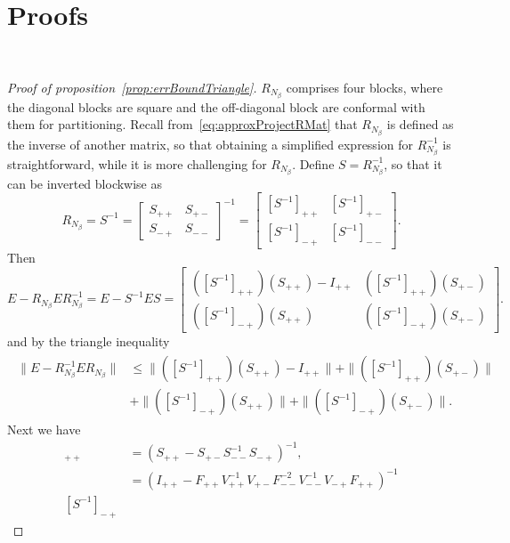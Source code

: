 \section{Proofs}~\label{app:Proofs}

\begin{proof}[Proof of proposition~\ref{prop:errBoundTriangle}]
    $R_{N_\beta}$ comprises four blocks, where the diagonal blocks are square and the off-diagonal block are conformal with them for partitioning. Recall from~\eqref{eq:approxProjectRMat} that $R_{N_\beta}$ is defined as the inverse of another matrix, so that obtaining a simplified expression for $R_{N_\beta}^{-1}$ is straightforward, while it is more challenging for $R_{N_\beta}$. Define $S=R_{N_\beta}^{-1}$, so that it can be inverted blockwise as
    \[
        R_{N_\beta}=S^{-1}=
        \begin{bmatrix}
            S_{++} & S_{+-}\\
            S_{-+} & S_{--}
        \end{bmatrix}^{-1}
        =
        \begin{bmatrix}
            [S^{-1}]_{++} & [S^{-1}]_{+-}\\
            [S^{-1}]_{-+} & [S^{-1}]_{--}
        \end{bmatrix}.
    \]
    Then
    \[
    E-R_{N_\beta}E R_{N_\beta}^{-1}
    =
    E-S^{-1} E S
    =
    \begin{bmatrix}
            ([S^{-1}]_{++})(S_{++})- I_{++} &
            ([S^{-1}]_{++})(S_{+-})\\
            ([S^{-1}]_{-+})(S_{++}) &
            ([S^{-1}]_{-+})(S_{+-})
        \end{bmatrix}.
    \]
    and by the triangle inequality
    \begin{align}
    \begin{split}
    \|E-R_{N_\beta}^{-1}E R_{N_\beta}\|
    &\leq
    \|([S^{-1}]_{++})(S_{++}) - I_{++}\|
    +\|([S^{-1}]_{++})(S_{+-})\|\\
    &+\|([S^{-1}]_{-+})(S_{++})\|
    +\|([S^{-1}]_{-+})(S_{+-})\|.
    \end{split}
    \label{eq:errBoundTriangle}
    \end{align} 
    Next we have
    \begin{align*}
        [S^{-1}]_{++}
        &=(S_{++}-S_{+-}S_{--}^{-1}S_{-+})^{-1},\\
        &=(I_{++}-F_{++}V_{++}^{-1}V_{+-}F_{--}^{-2}V_{--}^{-1}V_{-+}F_{++})^{-1}\\
        [S^{-1}]_{-+}

\end{align*}
\end{proof}
